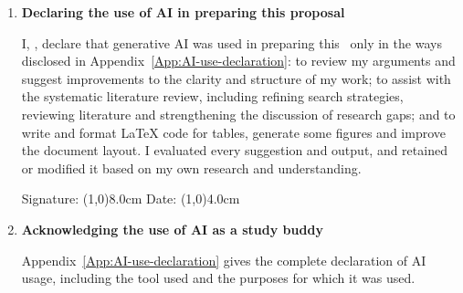 \begin{enumerate}[label=\Alph*.]
    \item \textbf{Declaring the use of AI in preparing this proposal}

        I, \theStudentName, declare that generative AI was used in preparing this \theTheDocumentType~only in the ways disclosed in Appendix~\ref{App:AI-use-declaration}: to review my arguments and suggest improvements to the clarity and structure of my work; to assist with the systematic literature review, including refining search strategies, reviewing literature and strengthening the discussion of research gaps; and to write and format LaTeX code for tables, generate some figures and improve the document layout. I evaluated every suggestion and output, and retained or modified it based on my own research and understanding.

        \vspace{1cm}

        Signature: \line(1,0){8.0cm}
        Date:	\line(1,0){4.0cm}\par
    \vspace{1cm}
    \item \textbf{Acknowledging the use of AI as a study buddy}

        Appendix~\ref{App:AI-use-declaration} gives the complete declaration of AI usage, including the tool used and the purposes for which it was used.
\end{enumerate}

